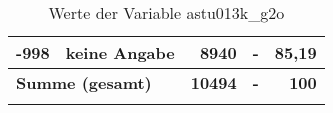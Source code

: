 \begin{longtable}{Xlrrr}
       -998 & keine Angabe & 8940 & - & 85,19 \\

     \midrule
     \multicolumn{2}{l}{\textbf{Summe (gesamt)}} & \textbf{10494} & \textbf{-} & \textbf{100} \\
     \bottomrule
     \caption{Werte der Variable astu013k\_g2o}
     \end{longtable}
     

